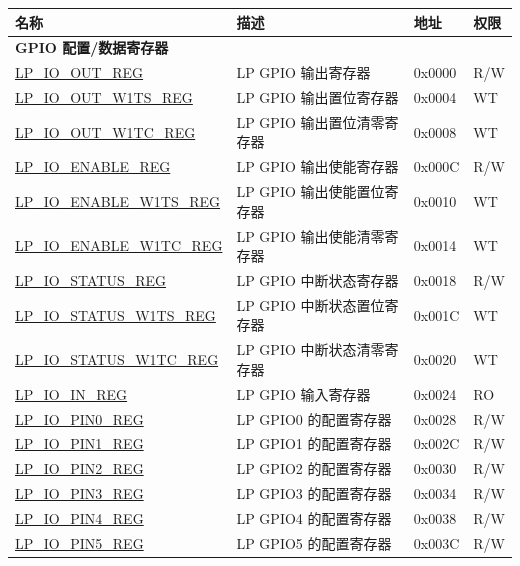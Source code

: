 \begin{longtable}{ | p{6.2cm} | p{7cm} | p{1.3cm} | p{1cm} | }
\hline\rowcolor{lightgray}
名称 & 描述 & 地址 & 权限 \\ \hline
\endhead
\multicolumn{4}{|l|}{\textbf{GPIO 配置/数据寄存器}} \\ \hline
\hyperref[regdesc:LPIOOUTREG]{LP\_IO\_OUT\_REG} & LP GPIO 输出寄存器 & 0x0000 & R/W \\ \hline
\hyperref[regdesc:LPIOOUTW1TSREG]{LP\_IO\_OUT\_W1TS\_REG} & LP GPIO 输出置位寄存器 & 0x0004 & WT \\ \hline
\hyperref[regdesc:LPIOOUTW1TCREG]{LP\_IO\_OUT\_W1TC\_REG} & LP GPIO 输出置位清零寄存器 & 0x0008 & WT \\ \hline
\hyperref[regdesc:LPIOENABLEREG]{LP\_IO\_ENABLE\_REG} & LP GPIO 输出使能寄存器 & 0x000C & R/W \\ \hline
\hyperref[regdesc:LPIOENABLEW1TSREG]{LP\_IO\_ENABLE\_W1TS\_REG} & LP GPIO 输出使能置位寄存器 & 0x0010 & WT \\ \hline
\hyperref[regdesc:LPIOENABLEW1TCREG]{LP\_IO\_ENABLE\_W1TC\_REG} & LP GPIO 输出使能清零寄存器 & 0x0014 & WT \\ \hline
\hyperref[regdesc:LPIOSTATUSREG]{LP\_IO\_STATUS\_REG} & LP GPIO 中断状态寄存器 & 0x0018 & R/W \\ \hline
\hyperref[regdesc:LPIOSTATUSW1TSREG]{LP\_IO\_STATUS\_W1TS\_REG} & LP GPIO 中断状态置位寄存器 & 0x001C & WT \\ \hline
\hyperref[regdesc:LPIOSTATUSW1TCREG]{LP\_IO\_STATUS\_W1TC\_REG} & LP GPIO 中断状态清零寄存器 & 0x0020 & WT \\ \hline
\hyperref[regdesc:LPIOINREG]{LP\_IO\_IN\_REG} & LP GPIO 输入寄存器 & 0x0024 & RO \\ \hline
\hyperref[regdesc:LPIOPINNREG]{LP\_IO\_PIN0\_REG} & LP GPIO0 的配置寄存器 & 0x0028 & R/W \\ \hline
\hyperref[regdesc:LPIOPINNREG]{LP\_IO\_PIN1\_REG} & LP GPIO1 的配置寄存器 & 0x002C & R/W \\ \hline
\hyperref[regdesc:LPIOPINNREG]{LP\_IO\_PIN2\_REG} & LP GPIO2 的配置寄存器 & 0x0030 & R/W \\ \hline
\hyperref[regdesc:LPIOPINNREG]{LP\_IO\_PIN3\_REG} & LP GPIO3 的配置寄存器 & 0x0034 & R/W \\ \hline
\hyperref[regdesc:LPIOPINNREG]{LP\_IO\_PIN4\_REG} & LP GPIO4 的配置寄存器 & 0x0038 & R/W \\ \hline
\hyperref[regdesc:LPIOPINNREG]{LP\_IO\_PIN5\_REG} & LP GPIO5 的配置寄存器 & 0x003C & R/W \\ \hline

\end{longtable}
